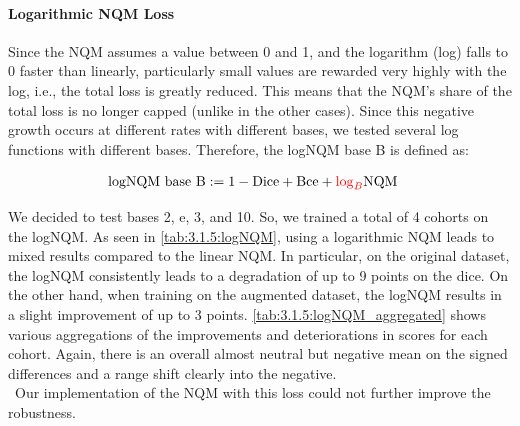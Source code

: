 \paragraph{Logarithmic NQM Loss}
\label{experiments:03.1.5:backbone_hippo:logNQM}
Since the NQM assumes a value between 0 and 1, and the logarithm (log) falls to 0 faster than linearly, particularly small values are rewarded very highly with the log, i.e., the total loss is greatly reduced. This means that the NQM's share of the total loss is no longer capped (unlike in the other cases). Since this negative growth occurs at different rates with different bases, we tested several log functions with different bases. Therefore, the logNQM base B is defined as:

\begin{align}
    \text{logNQM base B} &:= 1 - \mathrm{Dice} + \mathrm{Bce} + {\color{red}\log_B}\mathrm{NQM}
\end{align}

We decided to test bases 2, e, 3, and 10. So, we trained a total of 4 cohorts on the logNQM. As seen in \autoref{tab:3.1.5:logNQM}, using a logarithmic NQM leads to mixed results compared to the linear NQM. In particular, on the original dataset, the logNQM consistently leads to a degradation of up to 9 points on the dice. On the other hand, when training on the augmented dataset, the logNQM results in a slight improvement of up to 3 points. \autoref{tab:3.1.5:logNQM_aggregated} shows various aggregations of the improvements and deteriorations in scores for each cohort. Again, there is an overall almost neutral but negative mean on the signed differences and a range shift clearly into the negative.\\\
Our implementation of the NQM with this loss could not further improve the robustness. 
\iftable

\fi

